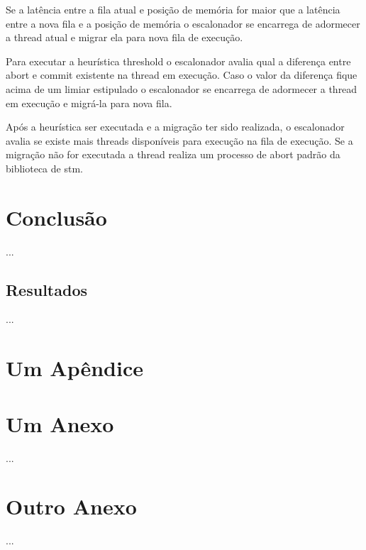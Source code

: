 \documentclass[diss,capa]{texufpel}
\begin{document}
Se a latência entre a fila atual e posição de memória for maior que a latência entre a nova fila e a posição de memória o escalonador se encarrega de adormecer a thread atual e migrar ela para nova fila de execução.

Para executar a heurística threshold o escalonador avalia qual a diferença entre abort e commit existente na thread em execução. Caso o valor da diferença fique acima de um limiar estipulado o escalonador se encarrega de adormecer a thread em execução e migrá-la para nova fila.

Após a heurística ser executada e a migração ter sido realizada, o escalonador avalia se existe mais threads disponíveis para execução na fila de execução. Se a migração não for executada a thread realiza um processo de abort padrão da biblioteca de stm.

\chapter{Conclusão}

...

\section{Resultados}

...



 

\apendices
\chapter{Um Apêndice}

\anexos
\chapter{Um Anexo}

...

\chapter{Outro Anexo}

...

\end{document}
